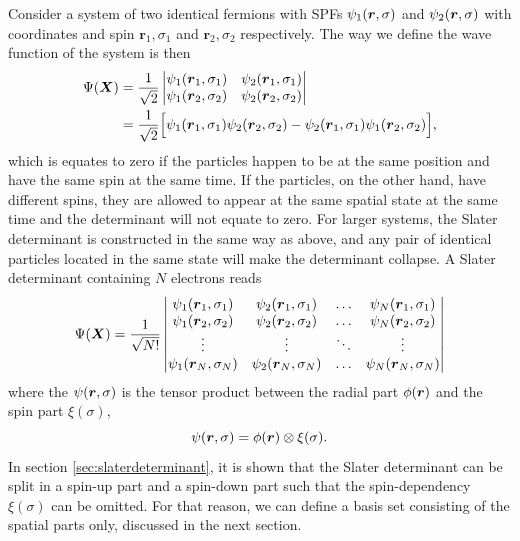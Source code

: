 Consider a system of two identical fermions with SPFs $\psi_1(\boldsymbol{{r}},\sigma)$ and $\psi_2(\boldsymbol{{r}},\sigma)$ with coordinates and spin $\boldsymbol{r}_1,\sigma_1$ and $\boldsymbol{r}_2,\sigma_2$ respectively. The way we define the wave function of the system is then
\begin{equation}
\begin{aligned}
\Psi(\boldsymbol{{X}})&=\frac{1}{\sqrt{2}}
\begin{vmatrix}
\psi_1(\boldsymbol{r}_1,\sigma_1) & \psi_2(\boldsymbol{r}_1,\sigma_1)\\
\psi_1(\boldsymbol{r}_2,\sigma_2) & \psi_2(\boldsymbol{r}_2,\sigma_2)
\end{vmatrix}\\
&=\frac{1}{\sqrt{2}}\Big[\psi_1(\boldsymbol{r}_1,\sigma_1)\psi_2(\boldsymbol{r}_2,\sigma_2)-\psi_2(\boldsymbol{r}_1,\sigma_1)\psi_1(\boldsymbol{r}_2,\sigma_2)\Big],
\end{aligned}
\end{equation}
which is equates to zero if the particles happen to be at the same position and have the same spin at the same time. If the particles, on the other hand, have different spins, they are allowed to appear at the same spatial state at the same time and the determinant will not equate to zero. For larger systems, the Slater determinant is constructed in the same way as above, and any pair of identical particles located in the same state will make the determinant collapse. A Slater determinant containing $N$ electrons reads
\begin{equation}
\Psi(\boldsymbol{{X}})=\frac{1}{\sqrt{N!}}
\begin{vmatrix}
\psi_1(\boldsymbol{r}_1,\sigma_1) & \psi_2(\boldsymbol{r}_1,\sigma_1) & \hdots & \psi_N(\boldsymbol{r}_1,\sigma_1)\\
\psi_1(\boldsymbol{r}_2,\sigma_2) & \psi_2(\boldsymbol{r}_2,\sigma_2) & \hdots & \psi_N(\boldsymbol{r}_2,\sigma_2)\\
\vdots & \vdots & \ddots & \vdots \\
\psi_1(\boldsymbol{r}_N,\sigma_N) & \psi_2(\boldsymbol{r}_N,\sigma_N) & \hdots & \psi_N(\boldsymbol{r}_N,\sigma_N)
\end{vmatrix}
\end{equation}
where the $\psi(\boldsymbol{{r}},\sigma)$ is the tensor product between the radial part $\phi(\boldsymbol{{r}})$ and the spin part $\xi(\sigma)$,
\begin{equation}
\psi(\boldsymbol{{r}},\sigma)=\phi(\boldsymbol{{r}})\otimes\xi(\sigma).
\end{equation}
In section \ref{sec:slaterdeterminant}, it is shown that the Slater determinant can be split in a spin-up part and a spin-down part such that the spin-dependency $\xi(\sigma)$ can be omitted. For that reason, we can define a basis set consisting of the spatial parts only, discussed in the next section. 

